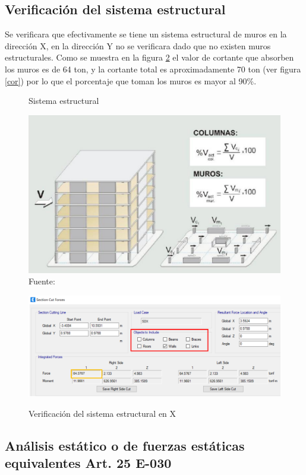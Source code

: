 \subsection{Verificación del sistema estructural}
Se verificara que efectivamente se tiene un sistema estructural de muros en la dirección X, en la dirección Y no se verificara dado que no existen muros estructurales. Como se muestra en la figura \ref{ver} el valor de cortante que absorben los muros es de 64 ton, y la cortante total es aproximadamente 70 ton (ver figura \ref{cor}) por lo que el porcentaje que toman los muros es mayor al 90\%.
\begin{figure}[h!]
    \centering
    \caption{Sistema estructural}
    \includegraphics[scale=0.7]{IMAGENES/18.PNG}
    \caption*{\small Fuente: \it \cite{comen}}
    \label{fig:my_label}
\end{figure}
\newpage
\begin{figure}[h!]
    \centering
    \caption{Verificación del sistema estructural en X}
    \includegraphics[scale=0.58]{IMAGENES/21.PNG}
    \label{ver}
\end{figure}

\subsection{Análisis estático o de fuerzas estáticas equivalentes Art. 25 E-030}
